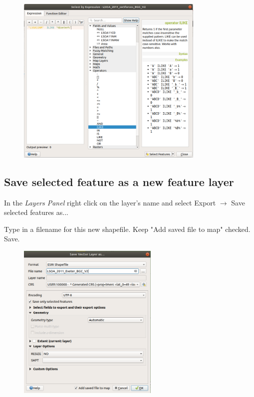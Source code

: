 \begin{figure}[!h]
	\centering
	\includegraphics[width=0.8\textwidth]{images/select_by_expression_form.png}
	\caption{}
	\label{ft_fig_firstfig3}
\end{figure}

\subsection{Save selected feature as a new feature layer}
In the \textit{Layers Panel} right click on the layer's name and select Export $\rightarrow$ Save selected features as...

Type in a filename for this new shapefile. Keep "Add saved file to map" checked. Save.

\begin{figure}[!h]
	\centering
	\includegraphics[width=0.6\textwidth]{images/save_vector_layer_form.png}
	\caption{}
	\label{ft_fig_firstfig3}
\end{figure}


